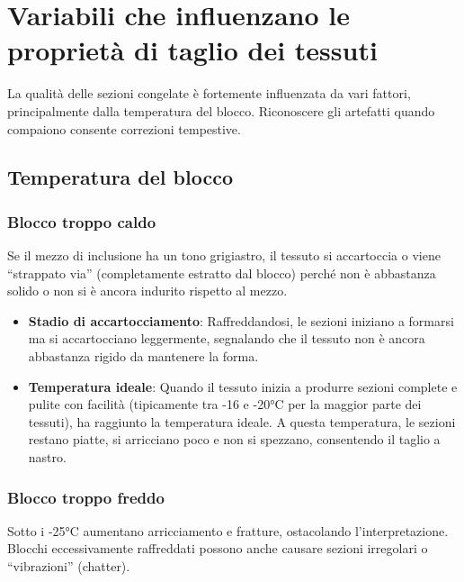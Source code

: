 \section{Variabili che influenzano le proprietà di taglio dei tessuti}
La qualità delle sezioni congelate è fortemente influenzata da vari fattori, principalmente dalla temperatura del blocco. Riconoscere gli artefatti quando compaiono consente correzioni tempestive.

\subsection{Temperatura del blocco}
\subsubsection{Blocco troppo caldo} 
Se il mezzo di inclusione ha un tono grigiastro, il tessuto si accartoccia o viene “strappato via” (completamente estratto dal blocco) perché non è abbastanza solido o non si è ancora indurito rispetto al mezzo.

\begin{itemize}
\item \textbf{Stadio di accartocciamento}: Raffreddandosi, le sezioni iniziano a formarsi ma si accartocciano leggermente, segnalando che il tessuto non è ancora abbastanza rigido da mantenere la forma.
\item \textbf{Temperatura ideale}: Quando il tessuto inizia a produrre sezioni complete e pulite con facilità (tipicamente tra -16 e -20°C per la maggior parte dei tessuti), ha raggiunto la temperatura ideale. A questa temperatura, le sezioni restano piatte, si arricciano poco e non si spezzano, consentendo il taglio a nastro.
\end{itemize}

\subsubsection{Blocco troppo freddo}
Sotto i -25°C aumentano arricciamento e fratture, ostacolando l'interpretazione. Blocchi eccessivamente raffreddati possono anche causare sezioni irregolari o ``vibrazioni'' (chatter).

